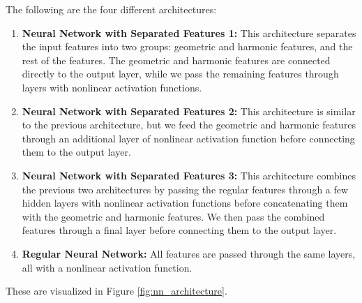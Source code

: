 The following are the four different architectures:
\begin{enumerate}
    \item \textbf{Neural Network with Separated Features 1:} This architecture separates the input features into two groups: geometric and harmonic features, and the rest of the features.
    The geometric and harmonic features are connected directly to the output layer, while we pass the remaining features through layers with nonlinear activation functions.
    \item \textbf{Neural Network with Separated Features 2:} This architecture is similar to the previous architecture,
    but we feed the geometric and harmonic features through an additional layer of nonlinear activation function before connecting them to the output layer.
    \item \textbf{Neural Network with Separated Features 3:} This architecture combines the previous two architectures by passing the regular features through a few hidden layers with nonlinear activation functions before concatenating them with the geometric and harmonic features.
    We then pass the combined features through a final layer before connecting them to the output layer.
    \item \textbf{Regular Neural Network:} All features are passed through the same layers, all with a nonlinear activation function.
\end{enumerate}
These are visualized in Figure \ref{fig:nn_architecture}.

